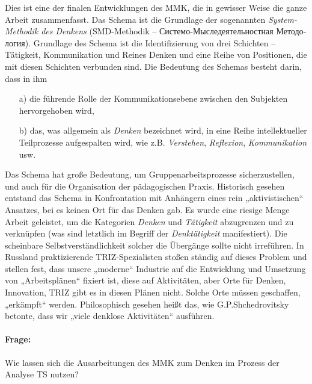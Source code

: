 \documentclass[11pt,a4paper]{article}
\begin{document}
Dies ist eine der finalen Entwicklungen des MMK, die in gewisser Weise die
ganze Arbeit zusammenfasst. Das Schema ist die Grundlage der sogenannten
\emph{System-Methodik des Denkens} (SMD-Methodik --
\foreignlanguage{russian}{Системо-Мыследеятельностная Методология}). Grundlage
des Schema ist die Identifizierung von drei Schichten -- Tätigkeit,
Kommunikation und Reines Denken und eine Reihe von Positionen, die mit diesen
Schichten verbunden sind. Die Bedeutung des Schemas besteht darin, dass in ihm 
\begin{itemize}
\item[a)] die führende Rolle der Kommunikationsebene zwischen den Subjekten
  hervorgehoben wird,
\item[b)] das, was allgemein als \emph{Denken} bezeichnet wird, in eine Reihe
  intellektueller Teilprozesse aufgespalten wird, wie z.B. \emph{Verstehen},
  \emph{Reflexion}, \emph{Kommunikation} usw.
\end{itemize}
Das Schema hat große Bedeutung, um Gruppenarbeitsprozesse sicherzustellen, und
auch für die Organisation der pädagogischen Praxis. Historisch gesehen
entstand das Schema in Konfrontation mit Anhängern eines rein „aktivistischen“
Ansatzes, bei es keinen Ort für das Denken gab. Es wurde eine riesige Menge
Arbeit geleistet, um die Kategorien \emph{Denken} und \emph{Tätigkeit}
abzugrenzen und zu verknüpfen (was sind letztlich im Begriff der
\emph{Denktätigkeit} manifestiert). Die scheinbare Selbstverständlichkeit
solcher die Übergänge sollte nicht irreführen. In Russland praktizierende
TRIZ-Spezialisten stoßen ständig auf dieses Problem und stellen fest, dass
unsere „moderne“ Industrie auf die Entwicklung und Umsetzung von
„Arbeitsplänen“ fixiert ist, diese auf Aktivitäten, aber Orte für Denken,
Innovation, TRIZ gibt es in diesen Plänen nicht. Solche Orte müssen
geschaffen, „erkämpft“ werden. Philosophisch gesehen heißt das, wie
G.P.Shchedrovitsky betonte, dass wir „viele denklose Aktivitäten“ ausführen.

\paragraph{Frage:}
Wie lassen sich die Ausarbeitungen des MMK zum Denken im Prozess der Analyse
TS nutzen?
\end{document}
